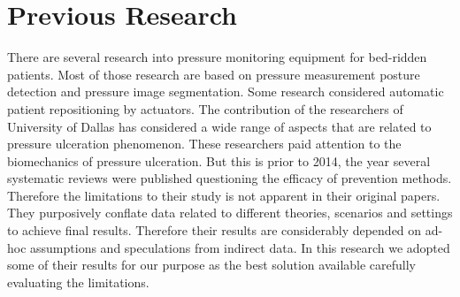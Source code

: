 \section{Previous Research}
There are several research into pressure monitoring equipment for bed-ridden patients. Most of those research are based on pressure measurement posture detection and pressure image segmentation. Some research considered automatic patient repositioning by actuators. The contribution of the researchers of University of Dallas has considered a wide range of aspects that are related to pressure ulceration phenomenon. These researchers paid attention to the biomechanics of pressure ulceration. But this is prior to 2014, the year several systematic reviews were published questioning the efficacy of prevention methods. Therefore the limitations to their study is not apparent in their original papers. They purposively conflate data related to different theories, scenarios and settings to achieve final results. Therefore their results are considerably depended on ad-hoc assumptions and speculations from indirect data. In this research we adopted some of their results for our purpose as the best solution available carefully evaluating the limitations.

